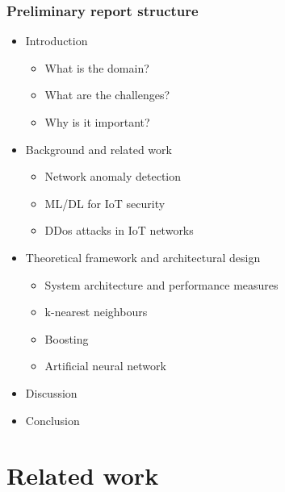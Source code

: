 \documentclass[10pt, presentation]{beamer}
\begin{document}
\begin{frame}
\frametitle{Preliminary report structure}
  \begin{itemize}
    \item Introduction
      \begin{itemize}
          \item What is the domain?
          \item What are the challenges?
          \item Why is it important?
      \end{itemize}
      \item Background and related work
      \begin{itemize}
          \item Network anomaly detection
          \item ML/DL for IoT security
          \item DDos attacks in IoT networks
        \end{itemize}
      \item Theoretical framework and architectural design
      \begin{itemize}
          \item System architecture and performance measures
          \item k-nearest neighbours
          \item Boosting
          \item Artificial neural network
        \end{itemize}
      \item Discussion
      \item Conclusion
  \end{itemize}
\end{frame}

\section{Related work}
\end{document}
